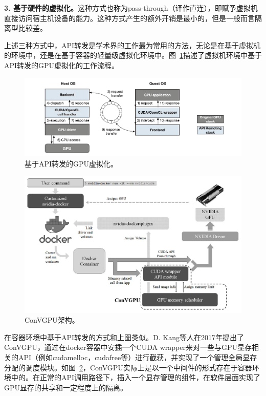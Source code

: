 \textbf{3. 基于硬件的虚拟化。}这种方式也称为pass-through（译作直连），即赋予虚拟机直接访问宿主机设备的能力。这种方式产生的额外开销是最小的，但是一般而言隔离型比较差。

上述三种方式中，API转发是学术界的工作最为常用的方法，无论是在基于虚拟机的环境中，还是在基于容器的轻量级虚拟化环境中。图~\ref{api_remoting}描述了虚拟机环境中基于API转发的GPU虚拟化的工作流程。

\begin{figure}[h]
    \centerline{\includegraphics[width=\textwidth]{figures/api-remoting.png}}
    \caption{基于API转发的GPU虚拟化。}
    \label{api_remoting}
\end{figure}

\begin{figure}[h]
    \centerline{\includegraphics[width=\textwidth]{figures/convgpu.png}}
    \caption{ConVGPU架构。}
    \label{convgpu_arch}
\end{figure}

在容器环境中基于API转发的方式和上图类似。D. Kang等人在2017年提出了ConVGPU\parencite{kang2017convgpu}，通过在docker容器中安插一个CUDA wrapper来对一些与GPU显存相关的API（例如cudamelloc，cudafree等）进行截获，并实现了一个管理全局显存分配的调度模块。如图~\ref{convgpu_arch}，ConVGPU实际上是以一个中间件的形式存在于容器环境中的。在正常的API调用路径下，插入一个显存管理的组件，在软件层面实现了GPU显存的共享和一定程度上的隔离。

